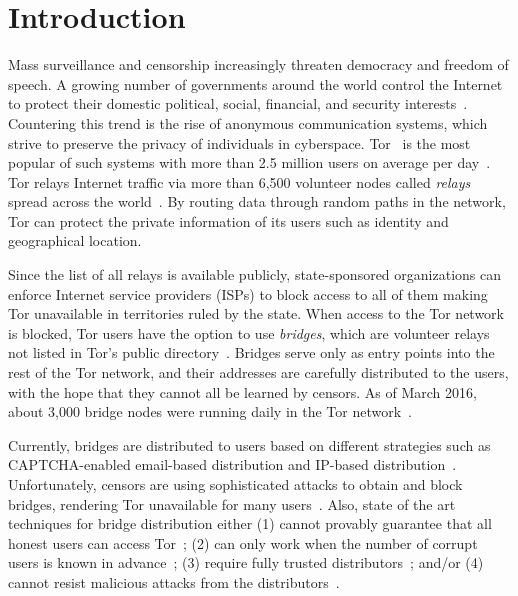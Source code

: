 \documentclass{sig-alternate-05-2015}
\begin{document}
\section{Introduction}
Mass surveillance and censorship increasingly threaten democracy and freedom of speech. A growing number of governments around the world control the Internet to protect their domestic political, social, financial, and security interests~\cite{Turner:2016:Surveillance,Rushe:2012:Censorship}. Countering this trend is the rise of anonymous communication systems, which strive to preserve the privacy of individuals in cyberspace. Tor~\cite{dingledine:2004} is the most popular of such systems with more than 2.5 million users on average per day~\cite{Tor:Users}. Tor relays Internet traffic via more than 6,500 volunteer nodes called \emph{relays} spread across the world~\cite{Tor:Relays}. By routing data through random paths in the network, Tor can protect the private information of its users such as identity and geographical location.


Since the list of all relays is available publicly, state-sponsored organizations can enforce Internet service providers (ISPs) to block access to all of them making Tor unavailable in territories ruled by the state. 
When access to the Tor network is blocked, Tor users have the option to use \emph{bridges}, which are volunteer relays not listed in Tor's public directory~\cite{Dingledine06designof}. Bridges serve only as entry points into the rest of the Tor network, and their addresses are carefully distributed to the users, with the hope that they cannot all be learned by censors. 
As of March 2016, about 3,000 bridge nodes were running daily in the Tor network~\cite{Tor:Bridges}.

Currently, bridges are distributed to users based on different strategies such as CAPTCHA-enabled email-based distribution and IP-based distribution~\cite{Dingledine06designof}. Unfortunately, censors are using sophisticated attacks to obtain
and block bridges, rendering Tor unavailable for many users~\cite{Dingledine:Bridges:2011,Ling:2012:infocom,BridgeBlockingChina:2012}.
Also, state of the art techniques for bridge distribution either (1) cannot provably guarantee that all honest users can access Tor~\cite{WangLBH:rBridge:13,McCoy:FC:2011,Sovran:2008:PSN}; (2) can only work when the number of corrupt users is known in advance~\cite{Mahdian:2010}; (3) require fully trusted distributors~\cite{McCoy:FC:2011,Mahdian:2010,Sovran:2008:PSN}; and/or (4) cannot resist malicious attacks from the distributors~\cite{WangLBH:rBridge:13,McCoy:FC:2011,Mahdian:2010,Sovran:2008:PSN}.
\end{document}
